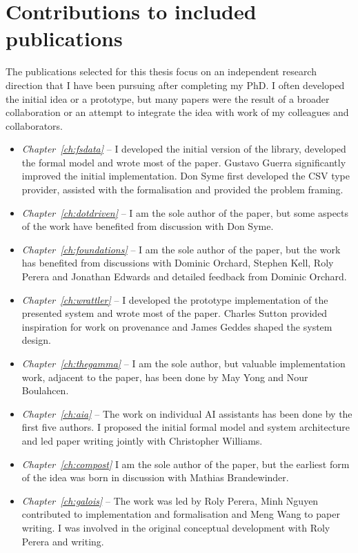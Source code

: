 \documentclass[fleqn,11pt]{report}
\theoremstyle{definition}
\newenvironment{nitemize}
{ \vspace{-0.4em}
  \begin{itemize}
    \setlength{\itemsep}{5pt}
    \setlength{\parskip}{0pt}
    \setlength{\parsep}{0pt} }
{ \end{itemize}
  \vspace{-0.4em} }
\begin{document}
\section{Contributions to included publications}
The publications selected for this thesis focus on an independent research direction that I
have been pursuing after completing my PhD. I often developed the initial idea or a prototype,
but many papers were the result of a broader collaboration or an attempt to integrate the idea
with work of my colleagues and collaborators.

\begin{nitemize}
\item \emph{Chapter~\ref{ch:fsdata}} \citep{petricek-2016-data} -- I developed the initial version
  of the library, developed the formal model and wrote most of the paper. Gustavo Guerra significantly
  improved the initial implementation. Don Syme first developed the CSV type provider, assisted
  with the formalisation and provided the problem framing.
\item \emph{Chapter~\ref{ch:dotdriven}} \citep{petricek-2017-dot} -- I am the sole author of the paper,
  but some aspects of the work have benefited from discussion with Don Syme.
\item \emph{Chapter~\ref{ch:foundations}} \citep{petricek-2020-live} -- I am the sole author of the paper,
  but the work has benefited from discussions with Dominic Orchard, Stephen Kell, Roly Perera and
  Jonathan Edwards and detailed feedback from Dominic Orchard.
\item \emph{Chapter~\ref{ch:wrattler}} \citep{petricek-2018-notebooks} -- I developed the prototype
  implementation of the presented system and wrote most of the paper. Charles Sutton provided
  inspiration for work on provenance and James Geddes shaped the system design.
\item \emph{Chapter~\ref{ch:thegamma}} \citep{petricek-2022-gamma} -- I am the sole author,
  but valuable implementation work, adjacent to the paper, has been done by May Yong and Nour Boulahcen.
\item \emph{Chapter~\ref{ch:aia}} \citep{petricek-2023-aia} -- The work on individual AI assistants has
  been done by the first five authors. I proposed the initial formal model and system architecture
  and led paper writing jointly with Christopher Williams.
\item \emph{Chapter~\ref{ch:compost}} \citep{petricek-2021-compost} I am the sole author of the paper,
  but the earliest form of the idea was born in discussion with Mathias Brandewinder.
\item \emph{Chapter~\ref{ch:galois}} \citep{petricek-2022-galois} -- The work was led by Roly Perera,
  Minh Nguyen contributed to implementation and formalisation and Meng Wang to paper writing.
  I was involved in the original conceptual development with Roly Perera and writing.
\end{nitemize}
\end{document}
